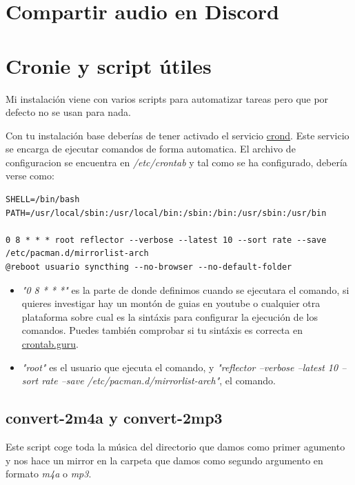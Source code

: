 \documentclass[12pt]{article}
\begin{document}
\section{Compartir audio en Discord}

\section{Cronie y script útiles}

Mi instalación viene con varios scripts para automatizar tareas pero que por defecto no se usan para nada.

Con tu instalación base deberías de tener activado el servicio \href{https://wiki.archlinux.org/title/cron}{crond}. Este servicio se encarga de ejecutar comandos de forma automatica. El archivo de configuracion se encuentra en \emph{/etc/crontab} y tal como se ha configurado, debería verse como:


\begin{lstlisting}[basicstyle=\scriptsize\ttfamily]
SHELL=/bin/bash
PATH=/usr/local/sbin:/usr/local/bin:/sbin:/bin:/usr/sbin:/usr/bin

0 8 * * * root reflector --verbose --latest 10 --sort rate --save /etc/pacman.d/mirrorlist-arch
@reboot usuario syncthing --no-browser --no-default-folder
\end{lstlisting}

\begin{itemize}
\setlength\itemsep{-0.2em}
\item \emph{"0 8 * * *"} es la parte de donde definimos cuando se ejecutara el comando, si quieres investigar hay un montón de guias en youtube o cualquier otra plataforma sobre cual es la sintáxis para configurar la ejecución de los comandos. Puedes también comprobar si tu sintáxis es correcta en \href{https://crontab.guru/}{crontab.guru}.
\item \emph{"root"} es el usuario que ejecuta el comando, y \emph{"reflector --verbose --latest 10 --sort rate --save /etc/pacman.d/mirrorlist-arch"}, el comando.
\end{itemize}

\subsection{convert-2m4a y convert-2mp3}

Este script coge toda la música del directorio que damos como primer agumento y nos hace un mirror en la carpeta que damos como segundo argumento en formato \emph{m4a} o \emph{mp3}.
\end{document}
